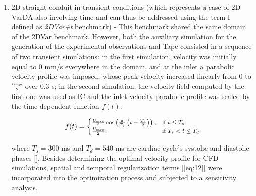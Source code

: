 \begin{enumerate}
    \item 2D straight conduit in transient conditions (which represents a case of 2D VarDA also involving time and can thus be addressed using the term I defined as \emph{2DVar+t} benchmark) - This benchmark shared the same domain of the 2DVar benchmark. However, both the auxiliary simulation for the generation of the experimental observations and Tape consisted in a sequence of two transient simulations: in the first simulation, velocity was initially equal to 0 mm/s everywhere in the domain, and at the inlet a parabolic velocity profile was imposed, whose peak velocity increased linearly from 0 to \( \frac{ U_{\text{max}}}{2} \) over 0.3 s; in the second simulation, the velocity field computed by the first one was used as IC and the inlet velocity parabolic profile was scaled by the time-dependent function \( f(t) \):

\begin{equation}
\small
f(t) = 
\begin{cases}
\frac{U_{\text{max}}}{2}\cos\left(\frac{\pi}{T_s}\left(t - \frac{T_s}{2}\right)\right), & \text{if } t \leq T_s \\
\frac{U_{\text{max}}}{2}, & \text{if } T_s < t \leq T_d
\label{eq:13}
\end{cases}
\end{equation}

where \( T_s = 300 \) ms and \( T_d = 540 \) ms are cardiac cycle's systolic and diastolic phases [\cite{Katz1977}]. Besides determining the optimal velocity profile for CFD simulations, spatial and temporal regularization terms [\cref{eq:12}] were incorporated into the optimization process and subjected to a sensitivity analysis.\\


\end{enumerate}
